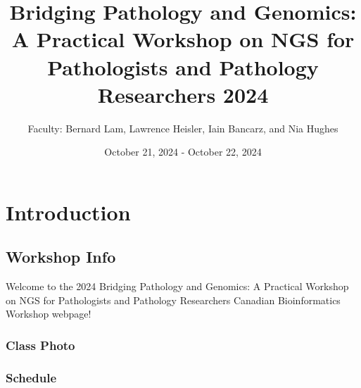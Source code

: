 \documentclass[
]{book}
\title{Bridging Pathology and Genomics: A Practical Workshop on NGS for Pathologists and Pathology Researchers 2024}
\author{Faculty: Bernard Lam, Lawrence Heisler, Iain Bancarz, and Nia Hughes}
\date{October 21, 2024 - October 22, 2024}
\begin{document}
\maketitle

{
\setcounter{tocdepth}{1}
\tableofcontents
}
\part{Introduction}\label{part-introduction}

\chapter{Workshop Info}\label{workshop-info}

Welcome to the 2024 Bridging Pathology and Genomics: A Practical Workshop on NGS for Pathologists and Pathology Researchers Canadian Bioinformatics Workshop webpage!

\section{Class Photo}\label{class-photo}

\section{Schedule}\label{schedule}
\end{document}
